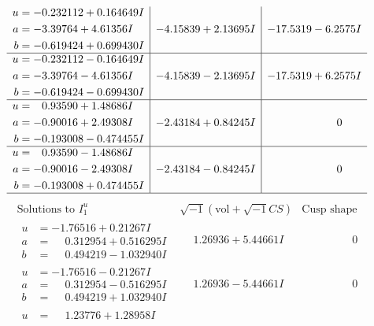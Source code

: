 \documentclass[1p]{elsarticle_modified}
\theoremstyle{definition}
\newcommand{\I}{\sqrt{-1}}
\begin{document}
$$\begin{array}{c|c|c}
\begin{aligned}
u &= -0.232112 + 0.164649 I \\
a &= -3.39764 + 4.61356 I \\
b &= -0.619424 + 0.699430 I\end{aligned}
 & -4.15839 + 2.13695 I & -17.5319 - 6.2575 I \\ \hline\begin{aligned}
u &= -0.232112 - 0.164649 I \\
a &= -3.39764 - 4.61356 I \\
b &= -0.619424 - 0.699430 I\end{aligned}
 & -4.15839 - 2.13695 I & -17.5319 + 6.2575 I \\ \hline\begin{aligned}
u &= \phantom{-}0.93590 + 1.48686 I \\
a &= -0.90016 + 2.49308 I \\
b &= -0.193008 - 0.474455 I\end{aligned}
 & -2.43184 + 0.84245 I & \phantom{-0.000000 } 0 \\ \hline\begin{aligned}
u &= \phantom{-}0.93590 - 1.48686 I \\
a &= -0.90016 - 2.49308 I \\
b &= -0.193008 + 0.474455 I\end{aligned}
 & -2.43184 - 0.84245 I & \phantom{-0.000000 } 0\\
 \hline 
 \end{array}$$\newpage$$\begin{array}{c|c|c}  
\text{Solutions to }I^u_{1}& \I (\text{vol} + \sqrt{-1}CS) & \text{Cusp shape}\\
 \hline 
\begin{aligned}
u &= -1.76516 + 0.21267 I \\
a &= \phantom{-}0.312954 + 0.516295 I \\
b &= \phantom{-}0.494219 - 1.032940 I\end{aligned}
 & \phantom{-}1.26936 + 5.44661 I & \phantom{-0.000000 } 0 \\ \hline\begin{aligned}
u &= -1.76516 - 0.21267 I \\
a &= \phantom{-}0.312954 - 0.516295 I \\
b &= \phantom{-}0.494219 + 1.032940 I\end{aligned}
 & \phantom{-}1.26936 - 5.44661 I & \phantom{-0.000000 } 0 \\ \hline\begin{aligned}
u &= \phantom{-}1.23776 + 1.28958 I \\

\end{aligned}
\end{array}$$
\end{document}
